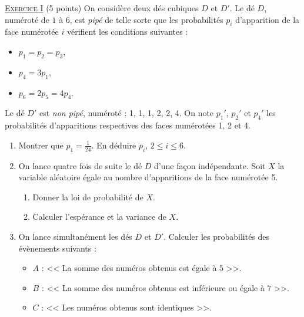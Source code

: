 \providecommand{\Courbe}{(\mathscr{C})}
\providecommand{\D}{(\mathscr{D})}
\providecommand{\Plan}{(\mathscr{P})}
\providecommand{\Ouv}{(O ; \vec{u} , \vec{v})}
\providecommand{\cm}{~\mathrm{cm}}
\providecommand{\dx}{~\mathrm{d}x}
\providecommand{\Arg}[1]{\mathrm{Arg}\left( #1 \right)}
\providecommand{\Angl}[2]{\left( \overrightarrow{#1} ; \overrightarrow{#2} \right)}
\noindent \underline{\textsc{Exercice I}} (5 points) \newline
      On considère deux dés cubiques $D$ et $D'$. Le dé $D$, numéroté de $1$ à $6$, est \emph{pipé} de telle sorte que les
      probabilités $p_i$ d'apparition de la face numérotée $i$ vérifient les conditions suivantes :
      \begin{itemize}
            \item $p_1 = p_2 = p_3$,
            \item $p_4 = 3 p_1$,
            \item $p_6 = 2 p_5 = 4 p_4$.
      \end{itemize}
      Le d\'e $D'$ est \emph{non pip\'e}, num\'erot\'e : 1, 1, 1, 2, 2, 4.
      On note $p_1'$, $p_2'$ et $p_4'$ les probabilit\'es d'apparitions respectives des faces num\'erot\'ees 1, 2 et 4.
      \begin{enumerate}
            \item Montrer que $p_1 = \frac{1}{24}$. En d\'eduire $p_i$, $ 2 \leq i \leq 6$.
            \item On lance quatre fois de suite le d\'e $D$ d'une fa\c{c}on ind\'ependante.
                  Soit $X$ la variable al\'eatoire \'egale au nombre d'apparitions de la face num\'erot\'ee 5.
                  \begin{enumerate}
                        \item Donner la loi de probabilit\'e de $X$.
                        \item Calculer l'esp\'erance et la variance de $X$.
                  \end{enumerate}
            \item On lance simultan\'ement les d\'es $D$ et $D'$.
                  Calculer les probabilit\'es des \'ev\`enements suivants : 
                  \begin{itemize}
                        \item $A$ : << La somme des num\'eros obtenus est \'egale \`a $5$ >>.
                        \item $B$ : << La somme des num\'eros obtenus est inf\'erieure ou \'egale \`a $7$ >>.
                        \item $C$ : << Les num\'eros obtenus sont identiques >>.
                  \end{itemize}
      \end{enumerate}
